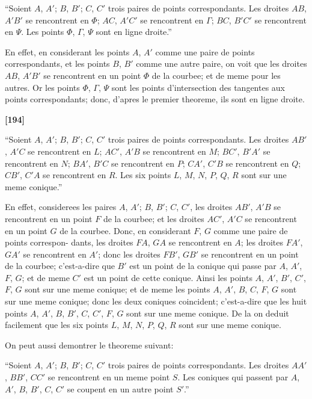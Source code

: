 \documentclass[11pt,a4paper]{book}
\begin{document}
``Soient $A$, $A'$; $B$, $B'$; $C$, $C'$ trois paires de points correspondants. Les droites
$AB$, $A'B'$ se rencontrent en $\Phi$; $AC$, $A'C'$ se rencontrent en $\Gamma$; $BC$, $B'C'$ se rencontrent en $\Psi$.
Les points $\Phi$, $\Gamma$, $\Psi$ sont en ligne droite.''

En effet, en considerant les points $A$, $A'$ comme une paire de points correspondants,
et les points $B$, $B'$ comme une autre paire, on voit que les droites $AB$, $A'B'$ se
rencontrent en un point $\Phi$ de la courbee; et de meme pour les autres. Or les points
$\Phi$, $\Gamma$, $\Psi$ sont les points d'intersection des tangentes aux points correspondants; donc,
d'apres le premier theoreme, ils sont en ligne droite.

\textbf{[194]}

``Soient $A$, $A'$; $B$, $B'$; $C$, $C'$ trois paires de points correspondants. Les droites
$AB'$, $A'C$ se rencontrent en $L$; $AC'$, $A'B$ se rencontrent en $M$; $BC'$, $B'A'$ se rencontrent
en $N$; $BA'$, $B'C$ se rencontrent en $P$; $CA'$, $C'B$ se rencontrent en $Q$; $CB'$, $C'A$ se
rencontrent en $R$. Les six points $L$, $M$, $N$, $P$, $Q$, $R$ sont sur une meme conique.''

En effet, considerees les paires $A$, $A'$; $B$, $B'$; $C$, $C'$, les droites $AB'$, $A'B$ se
rencontrent en un point $F$ de la courbee; et les droites $AC'$, $A'C$ se rencontrent en un
point $G$ de la courbee. Donc, en considerant $F$, $G$ comme une paire de points correspon-
dants, les droites $FA$, $GA$ se rencontrent en $A$; les droites $FA'$, $GA'$ se rencontrent en
$A'$; donc les droites $FB'$, $GB'$ se rencontrent en un point de la courbee; c'est-a-dire
que $B'$ est un point de la conique qui passe par $A$, $A'$, $F$, $G$; et de meme $C'$ est un
point de cette conique. Ainsi les points $A$, $A'$, $B'$, $C'$, $F$, $G$ sont sur une meme conique;
et de meme les points $A$, $A'$, $B$, $C$, $F$, $G$ sont sur une meme conique; donc les deux
coniques coincident; c'est-a-dire que les huit points $A$, $A'$, $B$, $B'$, $C$, $C'$, $F$, $G$ sont
sur une meme conique. De la on deduit facilement que les six points $L$, $M$, $N$, $P$, $Q$, $R$
 sont sur une meme conique.

On peut aussi demontrer le theoreme suivant:

``Soient $A$, $A'$; $B$, $B'$; $C$, $C'$ trois paires de points correspondants. Les droites
$AA'$, $BB'$, $CC'$ se rencontrent en un meme point $S$. Les coniques qui passent par
$A$, $A'$, $B$, $B'$, $C$, $C'$ se coupent en un autre point $S'$.''
\end{document}
